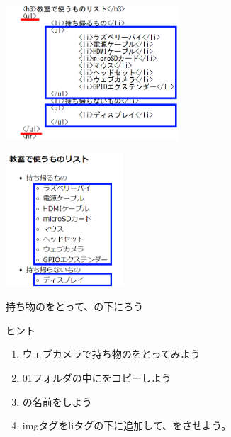 \documentclass[a4paper,12pt]{jarticle}
\begin{document}
\centering    
\begin{minipage}{0.45\linewidth}
  \includegraphics[width=\linewidth,height=5cm]{textbook-img1043.png}
\end{minipage}
\hfill
\vspace{20pt}
\begin{minipage}{0.45\linewidth}
  \includegraphics[width=\linewidth,height=5cm]{textbook-img1044.png}
\end{minipage}

\bigskip
\flushleft

\theQuestion\label{Q:hasAnswer04-11}

持ち物のをとって、の下にろう

ヒント

\begin{enumerate}
  \item
        ウェブカメラで持ち物のをとってみよう
  \item
        01フォルダの中にをコピーしよう
  \item {}の名前をしよう
  \item
        imgタグをliタグの下に追加して、をさせよう。
\end{enumerate}

\bigskip


\clearpage
\end{document}
